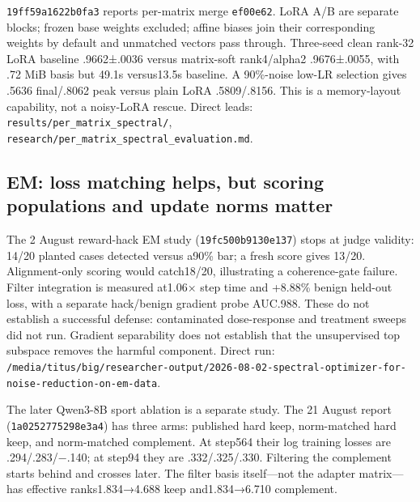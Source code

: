 \documentclass[
  british,
  10pt,
  a4paper,
]{article}
\begin{document}
\texttt{19ff59a1622b\allowbreak{}0fa3} reports per-matrix merge
\texttt{ef00e62}. LoRA A/B are separate blocks; frozen base weights
excluded; affine biases join their corresponding weights by default and
unmatched vectors pass through. Three-seed clean rank-32 LoRA baseline
.\allowbreak{}9662±.\allowbreak{}0036 versus matrix-\allowbreak{}soft
rank4/\allowbreak{}alpha2
.\allowbreak{}9676±.\allowbreak{}0055,\allowbreak{} with .72 MiB basis
but 49.1s versus13.\allowbreak{}5s baseline. A 90\%-noise low-LR
selection gives .5636 final/\allowbreak{}.\allowbreak{}8062 peak versus
plain LoRA
.\allowbreak{}5809/\allowbreak{}.\allowbreak{}8156.\allowbreak{} This is
a memory-\allowbreak{}layout capability,\allowbreak{} not a noisy-LoRA
rescue. Direct leads:
\texttt{results/\allowbreak{}per\_\allowbreak{}matrix\_\allowbreak{}spectral/\allowbreak{}},
\texttt{research/\allowbreak{}per\_\allowbreak{}matrix\_\allowbreak{}spectral\_\allowbreak{}evaluation.\allowbreak{}md}.

\subsection{EM: loss matching helps, but scoring populations and update
norms
matter}\label{email-evidence--em-loss-matching-helps-but-scoring-populations-and-update-norms-matter}

The 2 August reward-\allowbreak{}hack EM study
(\texttt{19fc500b9130\allowbreak{}e137}) stops at judge validity: 14/20
planted cases detected versus a90\% bar; a fresh score gives 13/20.
Alignment-\allowbreak{}only scoring would
catch18/\allowbreak{}20,\allowbreak{} illustrating a
coherence-\allowbreak{}gate failure. Filter integration is measured
at1.06× step time and +8.88\% benign held-out loss, with a separate
hack/\allowbreak{}benign gradient probe AUC.988. These do not establish
a successful defense: contaminated dose-\allowbreak{}response and
treatment sweeps did not run. Gradient separability does not establish
that the unsupervised top subspace removes the harmful component. Direct
run:
\texttt{/\allowbreak{}media/\allowbreak{}titus/\allowbreak{}big/\allowbreak{}researcher-\allowbreak{}output/\allowbreak{}2026-\allowbreak{}08-\allowbreak{}02-\allowbreak{}spectral-\allowbreak{}optimizer-\allowbreak{}for-\allowbreak{}noise-\allowbreak{}reduction-\allowbreak{}on-\allowbreak{}em-\allowbreak{}data}.

The later Qwen3-8B sport ablation is a separate study. The 21 August
report (\texttt{1a0252775298\allowbreak{}e3a4}) has three arms:
published hard keep, norm-\allowbreak{}matched hard keep, and
norm-\allowbreak{}matched complement.\allowbreak{} At step564 their log
training losses are
.\allowbreak{}294/\allowbreak{}.\allowbreak{}283/\allowbreak{}−.\allowbreak{}140;
at step94 they are
.\allowbreak{}332/\allowbreak{}.\allowbreak{}325/\allowbreak{}.\allowbreak{}330.\allowbreak{}
Filtering the complement starts behind and crosses later. The filter
basis itself---not the adapter matrix---has effective
ranks1.\allowbreak{}834→4.\allowbreak{}688 keep
and1.\allowbreak{}834→6.\allowbreak{}710 complement.\allowbreak{}
\end{document}
